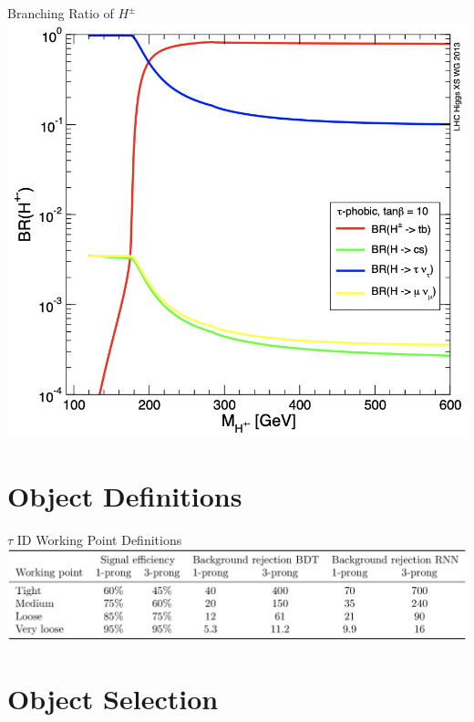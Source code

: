 \documentclass[aspectratio=169,xcolor=table]{beamer}
\begin{document}
    \begin{frame}{Branching Ratio of $H^{\pm}$}
    \centering
    \includegraphics[height=.8\textheight,keepaspectratio=True]{Charged_Higgs_BR.png}
    \end{frame}

  \section{Object Definitions }

    \begin{frame}{$\tau$ ID Working Point Definitions}
      \includegraphics[width=\textwidth,keepaspectratio=True]{TauIDWP.png}
    \end{frame}

  \section{Object Selection}
\end{document}
